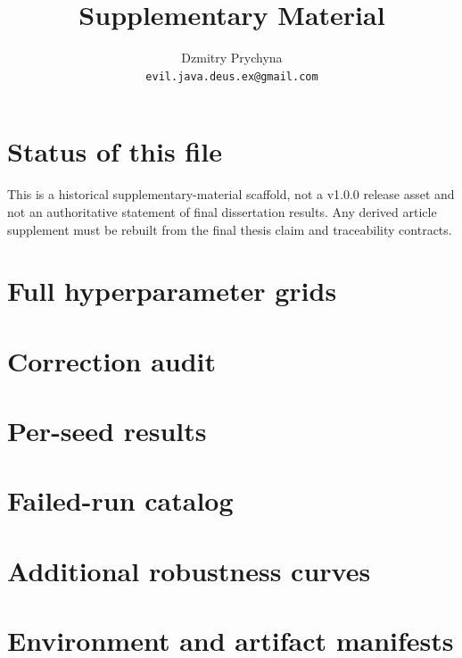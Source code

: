\documentclass[11pt]{article}
\title{Supplementary Material}
\author{Dzmitry Prychyna\\\texttt{evil.java.deus.ex@gmail.com}}
\begin{document}
\maketitle
\section*{Status of this file}
This is a historical supplementary-material scaffold, not a v1.0.0 release
asset and not an authoritative statement of final dissertation results. Any
derived article supplement must be rebuilt from the final thesis claim and
traceability contracts.
\section{Full hyperparameter grids}
\section{Correction audit}
\section{Per-seed results}
\section{Failed-run catalog}
\section{Additional robustness curves}
\section{Environment and artifact manifests}
\end{document}
